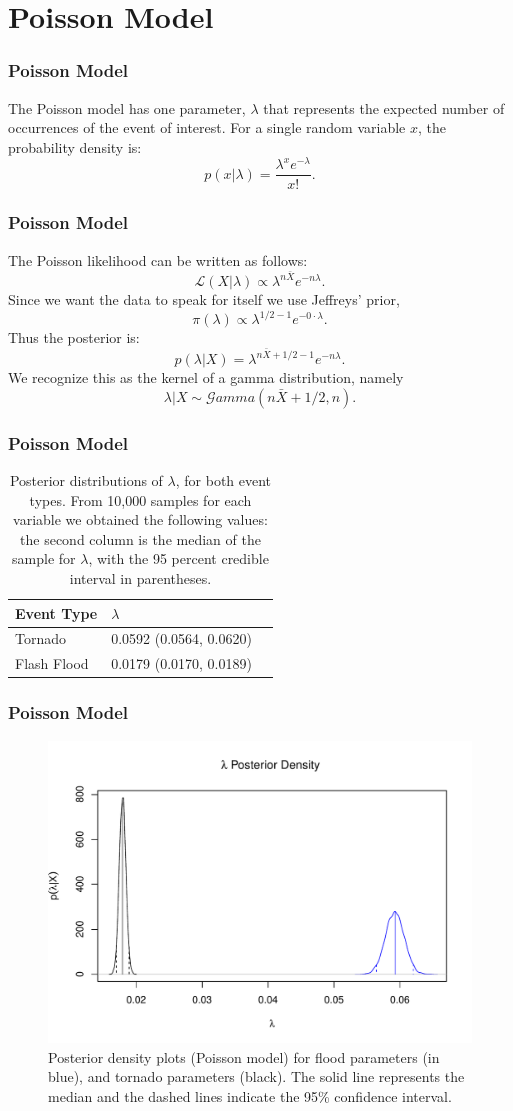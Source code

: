 \documentclass{beamer}
\begin{document}
	\section{Poisson Model}
	\begin{frame}
		\frametitle{Poisson Model}
		The Poisson model has one parameter, $\lambda$ that represents the expected number of occurrences of the event of interest. For a single random variable $x$, the probability density is:
$$p(x|\lambda)=\frac{\lambda^xe^{-\lambda}}{x!}.$$
	\end{frame}
	\begin{frame}
		\frametitle{Poisson Model}
		The Poisson likelihood can be written as follows:
$$\mathcal{L}(X|\lambda)\propto\lambda^{n\bar{X}}e^{-n\lambda}.$$  Since we want the data to speak for itself we use Jeffreys' prior, $$\pi(\lambda)\propto\lambda^{1/2-1}e^{-0\cdot\lambda}.$$ Thus the posterior is: $$p(\lambda|X)=\lambda^{n\bar{X}+1/2-1}e^{-n\lambda}.$$
We recognize this as the kernel of a gamma distribution, namely
$$\lambda|X\sim\mathcal{G}amma(n\bar{X}+1/2,n).$$

	\end{frame}
	\begin{frame}
		\frametitle{Poisson Model}
		\begin{table}
    \centering
    \caption{Posterior distributions of $\lambda$, for both event types. From 10,000 samples for each variable we obtained the following values: the second column is the median of the sample for $\lambda$, with the 95 percent credible interval in parentheses.}
    \label{t:rPOIS}
    \begin{tabular}{| l | l | l |}
    \hline
    Event Type & $\lambda$  \\ \hline
    Tornado & 0.0592 (0.0564, 0.0620) \\ \hline
    Flash Flood & 0.0179 (0.0170, 0.0189) \\ \hline
    \end{tabular}
\end{table}
	\end{frame}	
		\begin{frame}
		\frametitle{Poisson Model}
		\begin{figure}[p]
\centering
\includegraphics[width=.65\textwidth]{figure/POIS_Density.pdf}
\caption{Posterior density plots (Poisson model) for flood parameters (in blue), and tornado parameters (black). The solid line represents the median and the dashed lines indicate the 95\% confidence interval.}
\label{f:poisdensity}
\end{figure}
	\end{frame}
	
\end{document}
